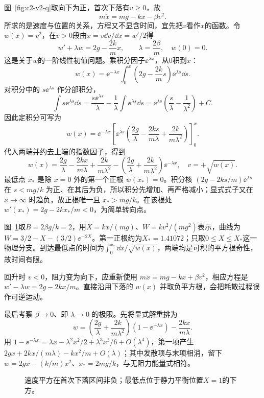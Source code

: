 \begin{solution}
图~\ref{fig:c2-v2-q}取向下为正，首次下落有$v\ge0$，故
\[m\ddot x=mg-kx-\beta v^2.\]
所求的是速度与位置的关系，方程又不显含时间，宜先把$v$看作$x$的函数。令$w(x)=v^2$，在$v>0$段由$\ddot x=v\dd v/\dd x=w'/2$得
\[w'+\lambda w=2g-\frac{2k}{m}x,\qquad
\lambda=\frac{2\beta}{m},\quad w(0)=0.\]
这是关于$w$的一阶线性初值问题。乘积分因子$\ee^{\lambda x}$，从$0$积到$x$：
\[w(x)=\ee^{-\lambda x}\int_0^x
\left(2g-\frac{2k}{m}s\right)\ee^{\lambda s}\dd s.\]
对积分中的 $s\ee^{\lambda s}$ 作分部积分，
\[
\int s\ee^{\lambda s}\dd s
=\frac{s\ee^{\lambda s}}\lambda-\frac1\lambda\int\ee^{\lambda s}\dd s
=\ee^{\lambda s}\left(\frac s\lambda-\frac1{\lambda^2}\right)+C.
\]
因此定积分可写为
\[
w(x)=\ee^{-\lambda x}\left[
\ee^{\lambda s}\left(\frac{2g}{\lambda}-\frac{2ks}{m\lambda}+\frac{2k}{m\lambda^2}\right)\right]_0^x.
\]
代入两端并约去上端的指数因子，得到
\[\boxed{w(x)=\frac{2g}{\lambda}-\frac{2kx}{m\lambda}
+\frac{2k}{m\lambda^2}
-\left(\frac{2g}{\lambda}+\frac{2k}{m\lambda^2}\right)\ee^{-\lambda x}},\quad
v=+\sqrt{w(x)}.\]
最低点 $x_*$ 是除 $x=0$ 外的第一个正根 $w(x_*)=0$。积分核 $(2g-2ks/m)\ee^{\lambda s}$ 在 $s<mg/k$ 为正、在其后为负，所以积分先增加、再严格减小；显式式子又在 $x\to\infty$ 时趋负，故正根唯一且 $x_*>mg/k$。在该根处 $w'(x_*)=2g-2kx_*/m<0$，为简单转向点。

图~\ref{fig:c2-v2-s}取$B=2\beta g/k=2$，用$X=kx/(mg)$、$W=kv^2/(mg^2)$表示，曲线为$W=3/2-X-(3/2)\ee^{-2X}$。第一正根约为$X_*=1.41072$；只取$0\le X\le X_*$这一物理分支。到达最低点的时间为$\int_0^{x_*}\dd x/\sqrt{w(x)}$，两端均是可积的平方根奇性，故时间有限。

回升时 $v<0$，阻力变为向下，应重新使用 $m\ddot x=mg-kx+\beta v^2$，相应方程是 $w'-\lambda w=2g-2kx/m$。直接沿用下落的 $w(x)$ 并取负平方根，会把耗散过程误作可逆运动。

最后考察 $\beta\to0$、即 $\lambda\to0$ 的极限。先将显式解重排为
\[
w=\left(\frac{2g}{\lambda}+\frac{2k}{m\lambda^2}\right)(1-\ee^{-\lambda x})
-\frac{2kx}{m\lambda}.
\]
用 $1-\ee^{-\lambda x}=\lambda x-\lambda^2x^2/2+\lambda^3x^3/6+O(\lambda^4)$，第一项产生 $2gx+2kx/(m\lambda)-kx^2/m+O(\lambda)$；其中发散项与末项相消，留下 $w=2gx-(k/m)x^2$、$x_*=2mg/k$，与无阻力能量式相符。
\begin{figure}[H]\centering
{}
\caption{速度平方在首次下落区间非负；最低点位于静力平衡位置$X=1$的下方。}\label{fig:c2-v2-s}
\end{figure}
\end{solution}
